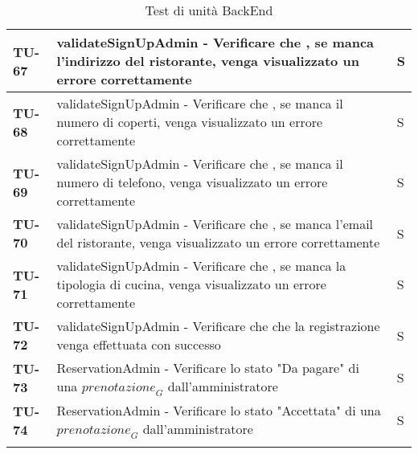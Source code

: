 \begin{longtable}{|>{\centering\arraybackslash}p{1.5cm}|p{15cm}|p{1cm}|}
  \hline
  \rowcolor{gray!10}
  \textbf{TU-67} & validateSignUpAdmin - Verificare che , se manca l'indirizzo del ristorante, venga visualizzato un errore correttamente  & S \\
  \hline
  \rowcolor{gray!10}
  \textbf{TU-68} & validateSignUpAdmin - Verificare che , se manca il numero di coperti, venga visualizzato un errore correttamente  & S \\
  \hline
  \rowcolor{gray!10}
  \textbf{TU-69} & validateSignUpAdmin - Verificare che , se manca il numero di telefono, venga visualizzato un errore correttamente  & S \\
  \hline
  \rowcolor{gray!10}
  \textbf{TU-70} & validateSignUpAdmin - Verificare che , se manca l'email del ristorante, venga visualizzato un errore correttamente  & S \\
  \hline
  \rowcolor{gray!10}
  \textbf{TU-71} & validateSignUpAdmin - Verificare che , se manca la tipologia di cucina, venga visualizzato un errore correttamente  & S \\
  \hline
  \rowcolor{gray!10}
  \textbf{TU-72} & validateSignUpAdmin - Verificare che che la registrazione venga effettuata con successo  & S \\
  \hline
  \rowcolor{gray!10}
  \textbf{TU-73} & ReservationAdmin - Verificare lo stato "Da pagare" di una $\textit{prenotazione}_G$ dall'amministratore & S \\
  \hline
  \rowcolor{gray!10}
  \textbf{TU-74} & ReservationAdmin - Verificare lo stato "Accettata" di una $\textit{prenotazione}_G$ dall'amministratore & S \\
  \hline
\caption{Test di unità BackEnd} 
\end{longtable}


